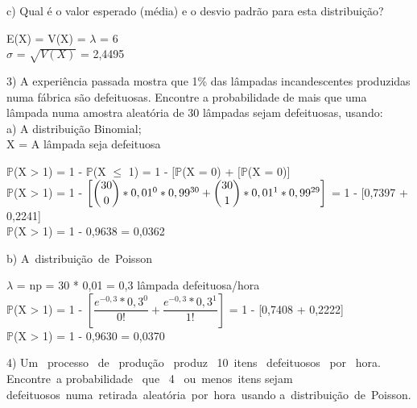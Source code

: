 \documentclass[12pt,a4paper]{article}
\begin{document}
	\vspace{1cm}
	c) Qual é o valor esperado (média) e o desvio padrão para esta distribuição?
	\begin{center}
		\vspace{0.5cm}
		E(X) = V(X) = $\lambda$ = 6
		\vspace{1cm}\\
		$\sigma$ = $\sqrt{V(X)}$ = 2,4495
	\end{center}
	\vspace{1cm}
	3) A experiência passada mostra que 1\% das lâmpadas incandescentes produzidas numa fábrica são defeituosas. Encontre a probabilidade de mais que uma lâmpada numa amostra aleatória de 30 lâmpadas sejam defeituosas, usando:\\
	a) A distribuição Binomial;
	\vspace{0.5cm}\\
	X = A lâmpada seja defeituosa
	\begin{center}
		\vspace{0.5cm}
		$\mathbb{P}$(X > 1) = 1 - $\mathbb{P}$(X $\leq$ 1) =  1 - $[\mathbb{P}$(X = 0) + $[\mathbb{P}$(X = 0)]
		\vspace{0.5cm}\\
		$\mathbb{P}$(X > 1) = 1 - $\left[\dbinom{30}{0} * 0,01^{0} * 0,99^{30} + \dbinom{30}{1} * 0,01^{1} * 0,99^{29}\right]$ = 1 - [0,7397 + 0,2241]
		\vspace{0.5cm}\\
		$\mathbb{P}$(X > 1) = 1 - 0,9638 = 0,0362
	\end{center}
	\vspace{1cm}
	b) A distribuição de Poisson
	\begin{center}
		\vspace{0.5cm}
		$\lambda$ = np = 30 * 0,01 = 0,3 lâmpada defeituosa/hora
		\vspace{1cm}\\
		$\mathbb{P}$(X > 1) = 1 - $\left[\dfrac{e^{-0,3} * 0,3^{0}}{0!} + \dfrac{e^{-0,3} * 0,3^{1}}{1!}\right]$ = 1 - [0,7408 + 0,2222]
		\vspace{0.5cm}\\
		$\mathbb{P}$(X > 1) = 1 - 0,9630 = 0,0370
	\end{center}
	\vspace{1cm}
	4) Um  processo  de  produção  produz  10 itens  defeituosos  por  hora.  Encontre a probabilidade  que  4  ou menos itens sejam defeituosos numa retirada aleatória por hora usando a distribuição de Poisson.
	\vspace{0.5cm}\\
\end{document}
